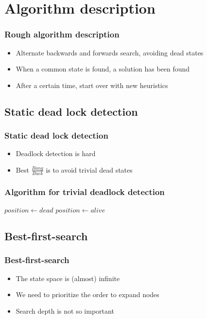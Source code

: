 \documentclass[]{beamer}
\begin{document}
\section{Algorithm description}

\begin{frame}
	\frametitle{Rough algorithm description}
	\begin{itemize}
		\item{Alternate backwards and forwards search, avoiding dead states}
		\item{When a common state is found, a solution has been found}
		\item{After a certain time, start over with new heuristics}
	\end{itemize}
\end{frame}

\subsection{Static dead lock detection}
\begin{frame}
	\frametitle{Static dead lock detection}
	\begin{itemize}
		\item{Deadlock detection is hard}
		\item{Best $\frac{Bang}{Buck}$ is to avoid trivial dead states}
	\end{itemize}
\end{frame}

\begin{frame}
	\frametitle{Algorithm for trivial deadlock detection}
	\begin{algorithmic}
				\State $position \gets dead$
			\EndFor
						\State $position \gets alive$
					\EndIf
				\EndFor
			\EndFor
		\EndFunction
	\end{algorithmic}

\end{frame}
\subsection{Best-first-search}
\begin{frame}
	\frametitle{Best-first-search}
	\begin{itemize}
		\item{The state space is (almost) infinite}
		\item{We need to prioritize the order to expand nodes}
		\item{Search depth is not so important}
	\end{itemize}
\end{frame}
\end{document}
